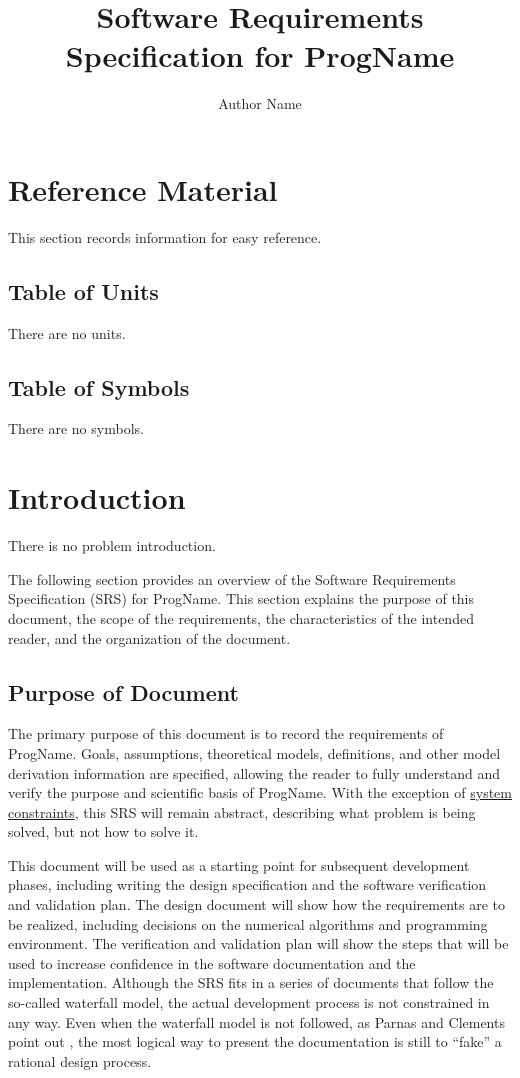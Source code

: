 \documentclass[12pt]{article}
\title{Software Requirements Specification for ProgName}
\author{Author Name}
\begin{document}
\maketitle
\tableofcontents
\newpage
\section{Reference Material}
\label{Sec:RefMat}
This section records information for easy reference.

\subsection{Table of Units}
\label{Sec:ToU}
There are no units.


\subsection{Table of Symbols}
\label{Sec:ToS}
There are no symbols.


\section{Introduction}
\label{Sec:Intro}
There is no problem introduction.

The following section provides an overview of the Software Requirements Specification (SRS) for ProgName. This section explains the purpose of this document, the scope of the requirements, the characteristics of the intended reader, and the organization of the document.

\subsection{Purpose of Document}
\label{Sec:DocPurpose}
The primary purpose of this document is to record the requirements of ProgName. Goals, assumptions, theoretical models, definitions, and other model derivation information are specified, allowing the reader to fully understand and verify the purpose and scientific basis of ProgName. With the exception of \hyperref[Sec:SysConstraints]{system constraints}, this SRS will remain abstract, describing what problem is being solved, but not how to solve it.

This document will be used as a starting point for subsequent development phases, including writing the design specification and the software verification and validation plan. The design document will show how the requirements are to be realized, including decisions on the numerical algorithms and programming environment. The verification and validation plan will show the steps that will be used to increase confidence in the software documentation and the implementation. Although the SRS fits in a series of documents that follow the so-called waterfall model, the actual development process is not constrained in any way. Even when the waterfall model is not followed, as Parnas and Clements point out \cite{parnasClements1986}, the most logical way to present the documentation is still to ``fake'' a rational design process.
\end{document}
